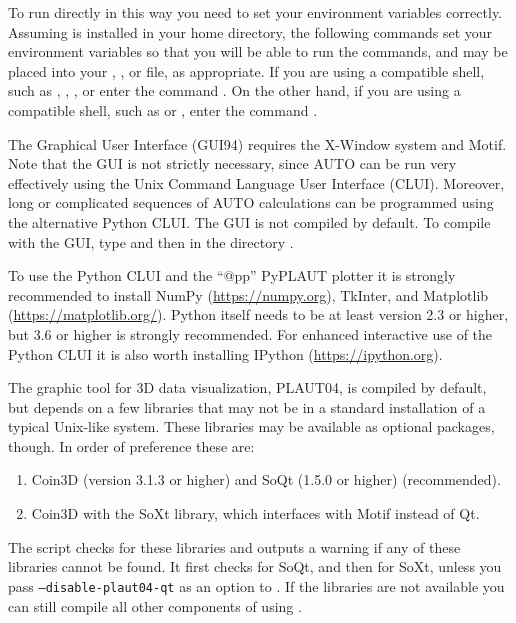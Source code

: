 \documentclass[12pt]{report}
\begin{document}
To run \AUTO directly in this way you need to set your environment
variables correctly.
Assuming \AUTO is installed in your home directory, the following
commands set your environment variables so that you will be able to
run the \AUTO commands, and may be placed into your ,
, or  file, as appropriate.  If you are
using a  compatible shell, such as ,
, , or  enter the command
.  On the
other hand, if you are using a  compatible shell, such
as  or , enter the command .

The Graphical User Interface (GUI94) requires the {\cal X-Window} system
and {\cal Motif}.
Note that the GUI is not strictly necessary, since {\cal AUTO} can be
run very effectively using the Unix Command Language User Interface (CLUI).
Moreover, long or complicated sequences of {\cal AUTO} calculations can
be programmed using the alternative Python CLUI. 
The GUI is not compiled by default. To compile
\AUTO with the GUI, type 
and then  in the directory .

To use the Python CLUI and the ``@pp'' {\cal PyPLAUT} plotter it
is strongly recommended to install NumPy
(\url{https://numpy.org}), TkInter, and
Matplotlib (\url{https://matplotlib.org/}).
Python itself needs to be at least version 2.3 or higher, but 3.6 or
higher is strongly recommended.
For enhanced interactive use of the Python CLUI it is also worth
installing IPython (\url{https://ipython.org}).

The graphic tool for 3D \AUTO data visualization, {\cal PLAUT04}, is
compiled by default, but depends on a few libraries that may not be
in a standard installation of a typical Unix-like
system. These libraries may be available as optional packages,
though. In order of preference these are:
\begin{enumerate}
\item
Coin3D (version 3.1.3 or higher) and SoQt (1.5.0 or higher)
(recommended).
\item
Coin3D with the SoXt library, which interfaces with Motif
instead of Qt.
\end{enumerate}

The  script checks
for these libraries and outputs a warning if any of these libraries
cannot be found. It first checks for SoQt, and then for SoXt, unless
you pass \texttt{\hyphenchar{}\relax --disable-plaut04-qt}
as an option to .
If the libraries are not available you can still compile
all other components of \AUTO using .
\end{document}
